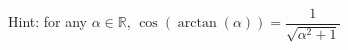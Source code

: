 Hint: for any $\alpha\in \mathbb{R}$, $\cos(\arctan(\alpha)) = \dfrac{1}{\sqrt{\alpha^2+1}}$

\begin{solution}
\end{solution}

\fi